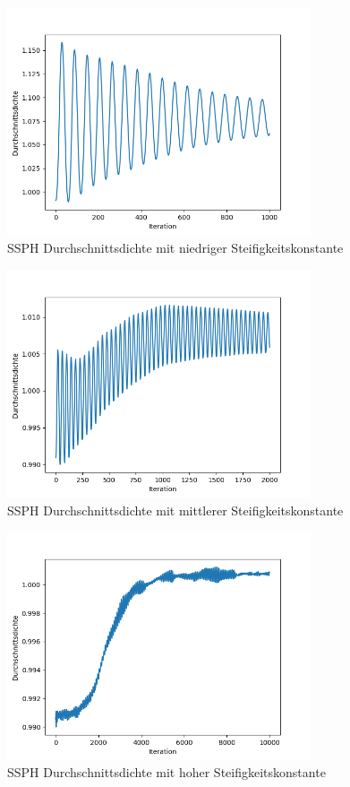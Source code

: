 \documentclass[11pt,
a4paper,
parskip=half, %
BCOR=10mm, %
english,
ngerman]{scrreprt}
\begin{document}
\begin{figure}[htb]
    \includegraphics[width=0.8\textwidth]{average_density_ssph_low_stiffness.png}
    \caption{SSPH Durchschnittsdichte mit niedriger Steifigkeitskonstante}
    \label{image:average_density_ssph_low_stiffness}
\end{figure}

\begin{figure}[htb]
    \includegraphics[width=0.8\textwidth]{average_density_ssph_mid_stiffness.png}
    \caption{SSPH Durchschnittsdichte mit mittlerer Steifigkeitskonstante}
    \label{image:average_density_ssph_mid_stiffness}
\end{figure}

\begin{figure}[htb]
    \includegraphics[width=0.8\textwidth]{average_density_ssph_high_stiffness.png}
    \caption{SSPH Durchschnittsdichte mit hoher Steifigkeitskonstante}
    \label{image:average_density_ssph_high_stiffness}
\end{figure}
\end{document}
